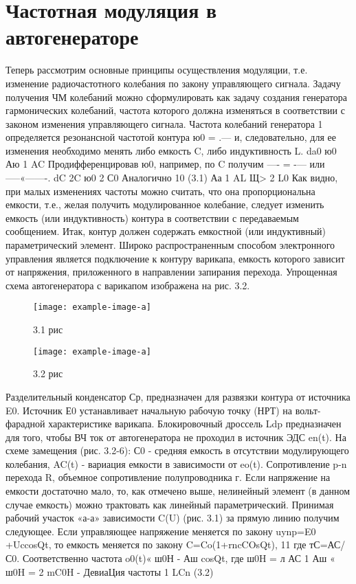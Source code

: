 ﻿\documentclass[a4paper,12pt]{article}
\begin{document}
\section{Частотная модуляция в автогенераторе}
Теперь рассмотрим основные принципы осуществления модуляции, т.е. изменение радиочастотного колебания по закону управляющего сигнала.
Задачу получения ЧМ колебаний можно сформулировать как задачу создания генератора гармонических колебаний, частота которого должна изменяться в соответствии с законом изменения управляющего сигнала. Частота колебаний генератора
1
определяется резонансной частотой контура ю0 = .--- и, следовательно, для ее
изменения необходимо менять либо емкость C, либо индуктивность L.
		da0	ю0	Аю	1 AC
Продифференцировав ю0, например, по C получим —- = -— или -----«-------.
dC	2C	ю0	2 С0
Аналогично
10
(3.1)
Аа	1 AL
Щ>	2 L0
Как видно, при малых изменениях частоты можно считать, что она пропорциональна емкости, т.е., желая получить модулированное колебание, следует изменить емкость (или индуктивность) контура в соответствии с передаваемым сообщением. Итак, контур должен содержать емкостной (или индуктивный) параметрический элемент.
Широко распространенным способом электронного управления является подключение к контуру варикапа, емкость которого зависит от напряжения, приложенного в направлении запирания перехода.
Упрощенная схема автогенератора с варикапом изображена на рис. 3.2.
\begin{figure}[H]
	\centering
	\texttt{[image: example-image-a]}
	\caption{3.1 рис}
\end{figure}
\begin{figure}[H]
	\centering
	\texttt{[image: example-image-a]}
	\caption{3.2 рис}
\end{figure}
Разделительный конденсатор Ср, предназначен для развязки контура от источника E0. Источник Е0 устанавливает начальную рабочую точку (НРТ) на вольт-фарадной характеристике варикапа. Блокировочный дроссель Ldp предназначен для того, чтобы ВЧ ток от автогенератора не проходил в источник ЭДС en(t).
На схеме замещения (рис. 3.2-6): С0 - средняя емкость в отсутствии модулирующего колебания, AC(t) - вариация емкости в зависимости от eo(t). Сопротивление p-n перехода R, объемное сопротивление полупроводника г.
Если напряжение на емкости достаточно мало, то, как отмечено выше, нелинейный элемент (в данном случае емкость) можно трактовать как линейный параметрический. Принимая рабочий участок «а-а» зависимости C(U) (рис. 3.1) за прямую линию получим следующее.
Если управляющее напряжение меняется по закону
uynp=E0 +UccosQt,
то емкость меняется по закону
C=Co(1+rncCOsQt),
11
где тС=АС/С0. Соответственно частота o0(t)« ш0Н - Аш cosQt, где ш0H =
л	АС	1
Аш « ш0H	= 2 mC0H - ДевиаЦия частоты
1
LCn
(3.2)
\end{document}
